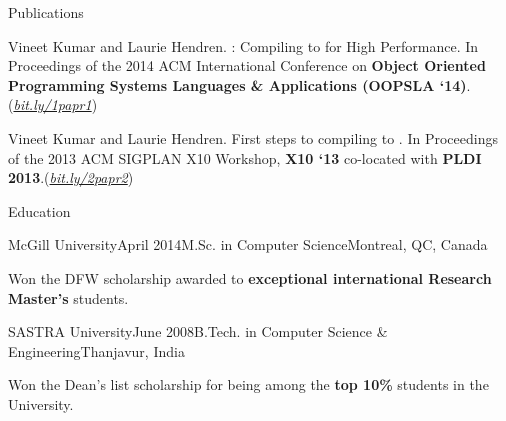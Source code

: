 \documentclass{resume} %
\begin{document}

\begin{rSection}{Publications}
\smallskip
\begin{lSubsection}


\item Vineet Kumar and Laurie Hendren. \mixten: Compiling \matlab to \xten for
	High Performance. In Proceedings of the 2014 ACM International
	Conference on \textbf{Object Oriented Programming Systems Languages \&
	Applications (OOPSLA `14)}.(\href{http://bit.ly/1papr1}{\em{bit.ly/1papr1}})

%
\item Vineet Kumar and Laurie Hendren. First steps to compiling \matlab to
	\xten. In Proceedings of the 2013 ACM SIGPLAN X10 Workshop, \textbf{X10
	`13} co-located with \textbf{PLDI
	2013}.(\href{http://bit.ly/2papr2}{\em{bit.ly/2papr2}})
\end{lSubsection}
\end{rSection}

 
\begin{rSection}{Education}

\begin{rSubsection}{McGill University}{April 2014}{M.Sc. in
Computer Science}{Montreal, QC, Canada} 
\item Won the DFW scholarship awarded to \textbf{exceptional international
        Research Master's} students.
\end{rSubsection}

\begin{rSubsection}{SASTRA University}{June 2008}{B.Tech. in Computer Science
\& Engineering}{Thanjavur, India} 
\item Won the {Dean's list scholarship} for being among the \textbf{top
10\%} students in the University. 
\end{rSubsection}

\end{rSection}
\end{document}

